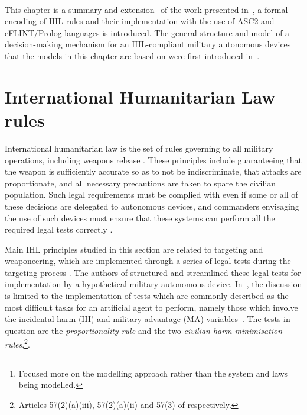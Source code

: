 This chapter is a summary and extension\footnote{Focused more on the modelling approach rather than the system and laws being modelled.} of the work presented in~\cite{zurek2022can}, a formal encoding of IHL rules and their implementation with the use of ASC2 and eFLINT/Prolog languages is introduced. The general structure and model of a decision-making mechanism for an IHL-compliant military autonomous devices that the models in this chapter are based on were first introduced in~\cite{zurek-coine22}.

\section{International Humanitarian Law rules}
\label{sec:ihl_model}
International humanitarian law is the set of rules governing to all military operations, including weapons release \cite{113Fleck}. 
These principles include guaranteeing that the weapon is sufficiently accurate so as to not be indiscriminate, that attacks are proportionate, and all necessary precautions are taken to spare the civilian population. Such legal requirements must be complied with even if some or all of these decisions are delegated to autonomous devices, and commanders envisaging the use of such devices must ensure that these systems can perform all the required legal tests correctly \cite{119BoothbyWEd}.

Main IHL principles studied in this section are related to targeting and weaponeering, which are implemented through a series of legal tests during the targeting process \cite{118DucheinePEtg,120HeineggWInkl,114CornGS}. The authors of \cite{zurek-coine22} structured and streamlined these legal tests for implementation by a hypothetical  military autonomous device. In~\cite{zurek2022jurix}, the discussion is limited to the implementation of tests which are commonly described as the most difficult tasks for an artificial agent to perform, namely those which involve the incidental harm (IH) and military advantage (MA) variables~\cite{119BoothbyWEd}. The tests in question are the \textit{proportionality rule} and the two \textit{civilian harm minimisation rules},\footnote{Articles 57(2)(a)(iii), 57(2)(a)(ii) and 57(3) of \cite{APIz} respectively.}.%
